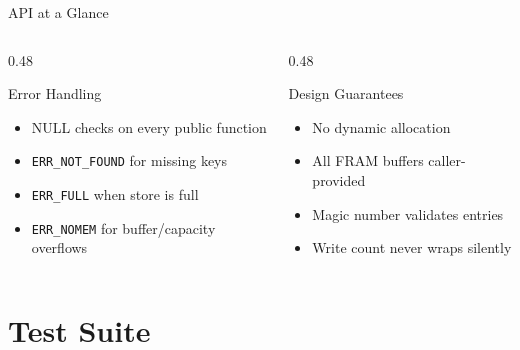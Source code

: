 \documentclass[aspectratio=169, 10pt]{beamer}
\begin{document}
\begin{frame}{API at a Glance}
\vspace{0.5em}
\begin{columns}[T]
\begin{column}{0.48\textwidth}
\begin{block}{Error Handling}
\begin{itemize}
  \item NULL checks on every public function
  \item \texttt{ERR\_NOT\_FOUND} for missing keys
  \item \texttt{ERR\_FULL} when store is full
  \item \texttt{ERR\_NOMEM} for buffer/capacity overflows
\end{itemize}
\end{block}
\end{column}
\begin{column}{0.48\textwidth}
\begin{block}{Design Guarantees}
\begin{itemize}
  \item No dynamic allocation
  \item All FRAM buffers caller-provided
  \item Magic number validates entries
  \item Write count never wraps silently
\end{itemize}
\end{block}
\end{column}
\end{columns}
\end{frame}

\section{Test Suite}
\end{document}
